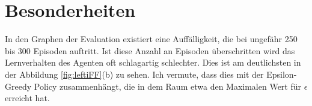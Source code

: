 \section{Besonderheiten}
In den Graphen der Evaluation existiert eine Auffälligkeit, die bei ungefähr 250 bis 300 Episoden auftritt. Ist diese Anzahl an Episoden überschritten wird das Lernverhalten des Agenten oft schlagartig schlechter. Dies ist am deutlichsten in der Abbildung \ref{fig:leftiFF}(b) zu sehen. Ich vermute, dass dies mit der Epsilon-Greedy Policy zusammenhängt, die in dem Raum etwa den Maximalen Wert für $\epsilon$ erreicht hat.





